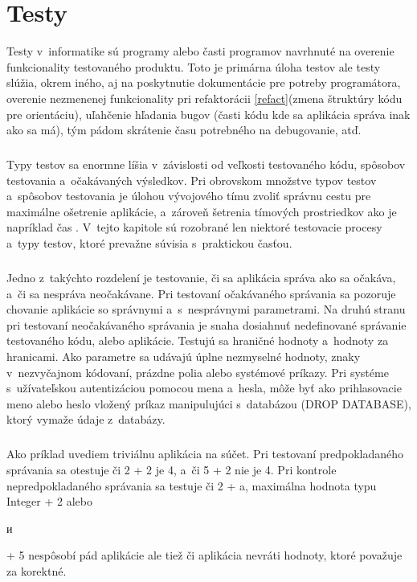 \documentclass[
  digital, %
  table,   %
oneside,
  nolof,     %
  nolot,     %
]{fithesis3}
\begin{document}
\chapter{Testy}
Testy v~informatike sú programy alebo časti programov navrhnuté na overenie funkcionality testovaného produktu. Toto je primárna úloha testov ale testy slúžia, okrem iného, aj na poskytnutie dokumentácie pre potreby programátora, overenie nezmenenej funkcionality pri refaktorácii \ref{refact}(zmena štruktúry kódu pre orientáciu), uľahčenie hľadania bugov (časti kódu kde sa aplikácia správa inak ako sa má), tým pádom skrátenie času potrebného na debugovanie, atď.
 \paragraph{}
Typy testov sa enormne líšia v~závislosti od veľkosti testovaného kódu, spôsobov testovania a~očakávaných výsledkov. Pri obrovskom množstve typov testov a~spôsobov testovania je úlohou vývojového tímu zvoliť správnu cestu pre maximálne ošetrenie aplikácie, a~zároveň šetrenia tímových prostriedkov ako je napríklad čas \cite{ssl}. V~tejto kapitole sú rozobrané len niektoré testovacie procesy a~typy testov, ktoré prevažne súvisia s~praktickou časťou.\paragraph{}
Jedno z~takýchto rozdelení je  testovanie, či sa aplikácia správa ako sa očakáva, a~či sa nespráva neočakávane. Pri testovaní očakávaného správania sa pozoruje chovanie aplikácie so správnymi a~s~nesprávnymi parametrami. Na druhú stranu pri testovaní neočakávaného správania je snaha dosiahnuť nedefinované správanie  testovaného kódu, alebo aplikácie. Testujú sa hraničné hodnoty a~hodnoty za hranicami. Ako parametre sa udávajú úplne nezmyselné hodnoty, znaky v~nezvyčajnom kódovaní, prázdne polia alebo systémové príkazy. Pri systéme s~užívateľskou  autentizáciou pomocou mena a~hesla, môže byť ako prihlasovacie meno alebo heslo vložený príkaz manipulujúci s~databázou (DROP DATABASE), ktorý vymaže údaje z~databázy. \paragraph{}
Ako príklad uvediem triviálnu aplikácia na súčet. Pri testovaní predpokladaného správania sa otestuje či 2 + 2 je 4, a~či 5 + 2 nie je 4. Pri kontrole nepredpokladaného správania sa testuje či 2 + a, maximálna hodnota typu Integer + 2 alebo \begin{otherlanguage}{russian} и \end{otherlanguage}  + 5 nespôsobí pád aplikácie ale tiež či aplikácia nevráti hodnoty, ktoré považuje za korektné. \paragraph{}
\end{document}

